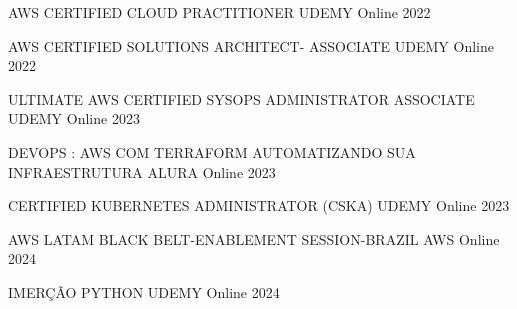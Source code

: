 

\begin{cvhonors}

  \cvhonor
    {AWS CERTIFIED CLOUD PRACTITIONER} %
    {UDEMY} %
    {Online} %
    {2022} %

  \cvhonor
    {AWS CERTIFIED SOLUTIONS ARCHITECT- ASSOCIATE} %
    {UDEMY} %
    {Online} %
    {2022} %

  \cvhonor
    {ULTIMATE AWS CERTIFIED SYSOPS ADMINISTRATOR ASSOCIATE} %
    {UDEMY} %
    {Online} %
    {2023} %

  \cvhonor
    {DEVOPS : AWS COM TERRAFORM AUTOMATIZANDO SUA INFRAESTRUTURA} %
    {ALURA} %
    {Online} %
    {2023} %

  \cvhonor
    {CERTIFIED KUBERNETES ADMINISTRATOR (CSKA)} %
    {UDEMY} %
    {Online} %
    {2023} %

  \cvhonor
    {AWS LATAM BLACK BELT-ENABLEMENT SESSION-BRAZIL} %
    {AWS} %
    {Online} %
    {2024} %

  \cvhonor
    {IMERÇÃO PYTHON} %
    {UDEMY} %
    {Online} %
    {2024} %


\end{cvhonors}
